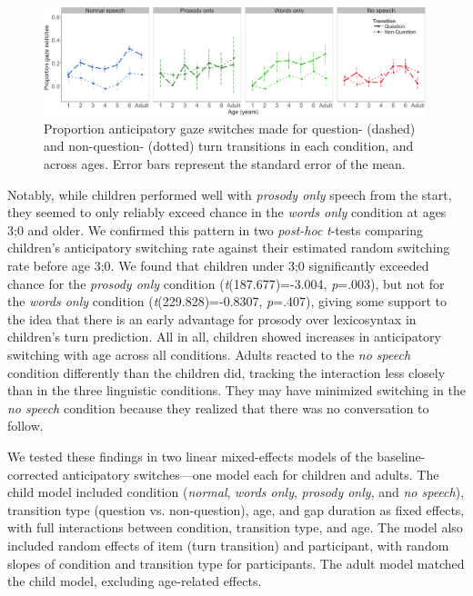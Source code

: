 \documentclass[authoryear, 12pt]{elsarticle}
\begin{document}
\begin{figure}[ht]
\begin{center}
\includegraphics[width=0.99\textwidth]{figures/FIG-QvsNQ-EN.png}
\end{center}
\caption{Proportion anticipatory gaze switches made for question- (dashed) and non-question- (dotted) turn transitions in each condition, and across ages. Error bars represent the standard error of the mean.} 
\label{questionsEN}
\end{figure}

Notably, while children performed well with \textit{prosody only} speech from the start, they seemed to only reliably exceed chance in the \textit{words only} condition at ages 3;0 and older. We confirmed this pattern in two \textit{post-hoc} \textit{t}-tests comparing children's anticipatory switching rate against their estimated random switching rate before age 3;0. We found that children under 3;0 significantly exceeded chance for the \textit{prosody only} condition (\textit{t}(187.677)=-3.004, \textit{p}=.003), but not for the \textit{words only} condition (\textit{t}(229.828)=-0.8307, \textit{p}=.407), giving some support to the idea that there is an early advantage for prosody over lexicosyntax in children's turn prediction. All in all, children showed increases in anticipatory switching with age across all conditions. Adults reacted to the \textit{no speech} condition differently than the children did, tracking the interaction less closely than in the three linguistic conditions. They may have minimized switching in the \textit{no speech} condition because they realized that there was no conversation to follow.

We tested these findings in two linear mixed-effects models of the baseline-corrected anticipatory switches---one model each for children and adults. The child model included condition (\textit{normal}, \textit{words only}, \textit{prosody only}, and \textit{no speech}), transition type (question vs. non-question), age, and gap duration as fixed effects, with full interactions between condition, transition type, and age. The model also included random effects of item (turn transition) and participant, with random slopes of condition and transition type for participants. The adult model matched the child model, excluding age-related effects.
\end{document}

